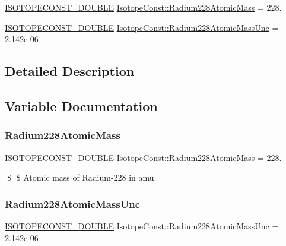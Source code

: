 \begin{DoxyCompactItemize}
\item 
\mbox{\hyperlink{group___isotope_const-_macros_ga8f45a7272ce02c0b4c65c44636ed719a}{I\+S\+O\+T\+O\+P\+E\+C\+O\+N\+S\+T\+\_\+\+D\+O\+U\+B\+LE}} \mbox{\hyperlink{group___isotope_const-_radium-_ra228_ga52dc05e10e8eaad90f6f8d43589b0635}{Isotope\+Const\+::\+Radium228\+Atomic\+Mass}} = 228.
\item 
\mbox{\hyperlink{group___isotope_const-_macros_ga8f45a7272ce02c0b4c65c44636ed719a}{I\+S\+O\+T\+O\+P\+E\+C\+O\+N\+S\+T\+\_\+\+D\+O\+U\+B\+LE}} \mbox{\hyperlink{group___isotope_const-_radium-_ra228_ga8644a6a0df51b773bf809176a5c523a0}{Isotope\+Const\+::\+Radium228\+Atomic\+Mass\+Unc}} = 2.\+142e-\/06
\end{DoxyCompactItemize}


\subsection{Detailed Description}


\subsection{Variable Documentation}
\mbox{\label{group___isotope_const-_radium-_ra228_ga52dc05e10e8eaad90f6f8d43589b0635}} 
\subsubsection{\texorpdfstring{Radium228\+Atomic\+Mass}{Radium228AtomicMass}}
{\footnotesize\ttfamily \mbox{\hyperlink{group___isotope_const-_macros_ga8f45a7272ce02c0b4c65c44636ed719a}{I\+S\+O\+T\+O\+P\+E\+C\+O\+N\+S\+T\+\_\+\+D\+O\+U\+B\+LE}} Isotope\+Const\+::\+Radium228\+Atomic\+Mass = 228.}

\$ \$ Atomic mass of Radium-\/228 in amu. \mbox{\label{group___isotope_const-_radium-_ra228_ga8644a6a0df51b773bf809176a5c523a0}} 
\subsubsection{\texorpdfstring{Radium228\+Atomic\+Mass\+Unc}{Radium228AtomicMassUnc}}
{\footnotesize\ttfamily \mbox{\hyperlink{group___isotope_const-_macros_ga8f45a7272ce02c0b4c65c44636ed719a}{I\+S\+O\+T\+O\+P\+E\+C\+O\+N\+S\+T\+\_\+\+D\+O\+U\+B\+LE}} Isotope\+Const\+::\+Radium228\+Atomic\+Mass\+Unc = 2.\+142e-\/06}

